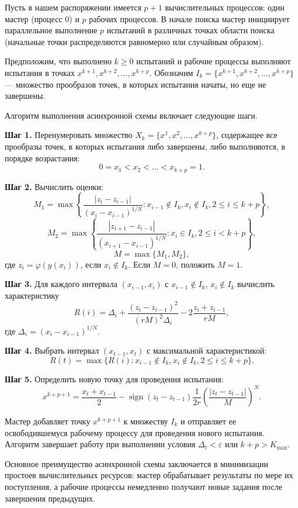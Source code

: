 \documentclass[10pt,a4paper]{book}
\begin{document}
Пусть в нашем распоряжении имеется $p+1$ вычислительных процессов: один мастер (процесс 0) и $p$ рабочих процессов. В начале поиска мастер инициирует параллельное выполнение $p$ испытаний в различных точках области поиска (начальные точки распределяются равномерно или случайным образом).

Предположим, что выполнено $k \geq 0$ испытаний и рабочие процессы выполняют испытания в точках $x^{k+1}, x^{k+2}, \ldots, x^{k+p}$. Обозначим $I_k = \{x^{k+1}, x^{k+2}, \ldots, x^{k+p}\}$ --- множество прообразов точек, в которых испытания начаты, но еще не завершены.

Алгоритм выполнения асинхронной схемы включает следующие шаги.

\textbf{Шаг 1.} Перенумеровать множество $X_k = \{x^1, x^2, \ldots, x^{k+p}\}$, содержащее все прообразы точек, в которых испытания либо завершены, либо выполняются, в порядке возрастания:
\[
0 = x_1 < x_2 < \ldots < x_{k+p} = 1.
\]

\textbf{Шаг 2.} Вычислить оценки:
\[
M_1 = \max\left\{ \frac{|z_i - z_{i-1}|}{(x_i - x_{i-1})^{1/N}} : x_{i-1} \notin I_k, x_i \notin I_k, 2 \leq i \leq k+p \right\},
\]
\[
M_2 = \max\left\{ \frac{|z_{i+1} - z_{i-1}|}{(x_{i+1} - x_{i-1})^{1/N}} : x_i \in I_k, 2 \leq i < k+p \right\},
\]
\[
M = \max\{M_1, M_2\},
\]
где $z_i = \varphi(y(x_i))$, если $x_i \notin I_k$. Если $M = 0$, положить $M = 1$.

\textbf{Шаг 3.} Для каждого интервала $(x_{i-1}, x_i)$ с $x_{i-1} \notin I_k$, $x_i \notin I_k$ вычислить характеристику
\[
R(i) = \Delta_i + \frac{(z_i - z_{i-1})^2}{(rM)^2\Delta_i} - 2\frac{z_i + z_{i-1}}{rM},
\]
где $\Delta_i = (x_i - x_{i-1})^{1/N}$.

\textbf{Шаг 4.} Выбрать интервал $(x_{t-1}, x_t)$ с максимальной характеристикой:
\[
R(t) = \max\{ R(i) : x_{i-1} \notin I_k, x_i \notin I_k, 2 \leq i \leq k+p \}.
\]

\textbf{Шаг 5.} Определить новую точку для проведения испытания:
\[
x^{k+p+1} = \frac{x_t + x_{t-1}}{2} - \operatorname{sign}(z_t - z_{t-1}) \frac{1}{2r} \left( \frac{|z_t - z_{t-1}|}{M} \right)^N.
\]

Мастер добавляет точку $x^{k+p+1}$ к множеству $I_k$ и отправляет ее освободившемуся рабочему процессу для проведения нового испытания. Алгоритм завершает работу при выполнении условия $\Delta_t < \varepsilon$ или $k+p > K_{\max}$.

Основное преимущество асинхронной схемы заключается в минимизации простоев вычислительных ресурсов: мастер обрабатывает результаты по мере их поступления, а рабочие процессы немедленно получают новые задания после завершения предыдущих.
\end{document}
